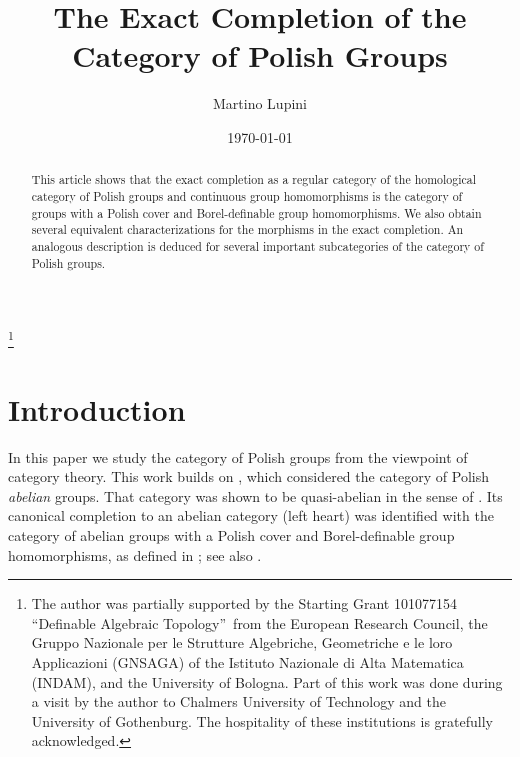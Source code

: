 \documentclass[12pt]{amsart}
\theoremstyle{definition}
\begin{document}
\title[The Exact Completion of the Category of Polish Groups]{The Exact
Completion of the Category of Polish Groups}
\author{Martino Lupini}
\address{Dipartimento di Matematica, Universit\`{a} di Bologna, Piazza di
Porta S. Donato, 5, 40126 Bologna,\ Italy}
\thanks{The author was partially supported by the Starting Grant 101077154
\textquotedblleft Definable Algebraic Topology\textquotedblright\ from the
European Research Council, the Gruppo Nazionale per le Strutture Algebriche,
Geometriche e le loro Applicazioni (GNSAGA) of the Istituto Nazionale di
Alta Matematica (INDAM), and the University of Bologna. Part of this work
was done during a visit by the author to Chalmers University of Technology and the
University of Gothenburg. The hospitality of these institutions is
gratefully acknowledged.}
\date{\today }

\begin{abstract}
This article shows that the exact completion as a regular category of the
homological category of Polish groups and continuous group homomorphisms is
the category of groups with a Polish cover and Borel-definable group
homomorphisms. We also obtain several equivalent characterizations for the
morphisms in the exact completion. An analogous description is deduced for
several important subcategories of the category of Polish groups.
\end{abstract}

\setcounter{tocdepth}{1}

\maketitle
\tableofcontents


\section{Introduction}

In this paper we study the category of Polish groups from the viewpoint of
category theory. This work builds on \cite{lupini_looking_2024}, which
considered the category of Polish \emph{abelian} groups. That category was
shown to be quasi-abelian in the sense of \cite%
{schneiders_quasi-abelian_1999}. Its canonical completion to an abelian
category (left heart) was identified with the category of abelian groups
with a Polish cover and Borel-definable group homomorphisms, as defined in 
\cite{bergfalk_definable_2024,bergfalk_definable_2024-1}; see also \cite%
{casarosa_homological_2026,lupini_applications_2025}.
\end{document}

